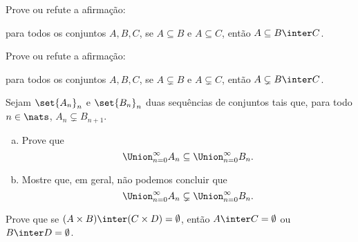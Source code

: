 \begin{exercise}
    Prove ou refute a afirmação:

    para todos os conjuntos $A, B, C$, se $A \subseteq B$ e $A \subseteq C$, então $A \subseteq B \inter C$.
\end{exercise}

\begin{exercise}
    Prove ou refute a afirmação:

    para todos os conjuntos $A, B, C$, se $A \subsetneq B$ e $A \subsetneq C$, então $A \subsetneq B \inter C$.
\end{exercise}

\begin{exercise}
    Sejam $\set {A_n}_n$ e $\set {B_n}_n$ duas sequências de conjuntos tais que, para todo $n \in \nats$, $A_n \subsetneq B_{n+1}$.
    \begin{enumerate}[(a)]
        \item Prove que
            $$
                \Union_{n=0}^{\infty} A_n \subseteq \Union_{n=0}^{\infty} B_n.
            $$
        \item Mostre que, em geral, não podemos concluir que
            $$
                \Union_{n=0}^{\infty} A_n \subsetneq \Union_{n=0}^{\infty} B_n.
            $$
    \end{enumerate}
\end{exercise}

\begin{exercise}
    Prove que se $(A \times B) \inter (C \times D) = \emptyset$, então $A \inter C = \emptyset$ ou $B \inter D = \emptyset$.
\end{exercise}
